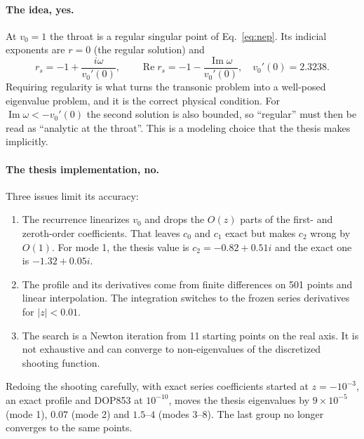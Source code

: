 \documentclass[11pt]{article}
\newcommand{\Real}{\operatorname{Re}}
\newcommand{\Imag}{\operatorname{Im}}
\begin{document}
\paragraph{The idea, yes.} At $v_0=1$ the throat is a regular singular point of Eq.~\eqref{eq:nep}. Its
indicial exponents are $r=0$ (the regular solution) and
\begin{equation}
  r_s = -1 + \frac{i\omega}{v_0'(0)},\qquad \Real r_s = -1 - \frac{\Imag\omega}{v_0'(0)},\quad v_0'(0)=2.3238 .
\end{equation}
Requiring regularity is what turns the transonic problem into a well-posed eigenvalue problem, and it is the
correct physical condition. For $\Imag\omega<-v_0'(0)$ the second solution is also bounded, so ``regular'' must
then be read as ``analytic at the throat''. This is a modeling choice that the thesis makes implicitly.

\paragraph{The thesis implementation, no.} Three issues limit its accuracy:
\begin{enumerate}
  \item The recurrence linearizes $v_0$ and drops the $O(z)$ parts of the first- and zeroth-order
  coefficients. That leaves $c_0$ and $c_1$ exact but makes $c_2$ wrong by $O(1)$. For mode 1, the thesis
  value is $c_2=-0.82+0.51i$ and the exact one is $-1.32+0.05i$.
  \item The profile and its derivatives come from finite differences on 501 points and linear interpolation.
  The integration switches to the frozen series derivatives for $|z|<0.01$.
  \item The search is a Newton iteration from 11 starting points on the real axis. It is not exhaustive and
  can converge to non-eigenvalues of the discretized shooting function.
\end{enumerate}
Redoing the shooting carefully, with exact series coefficients started at $z=-10^{-3}$, an exact profile and
DOP853 at $10^{-10}$, moves the thesis eigenvalues by $9\times10^{-5}$ (mode 1), $0.07$ (mode 2) and
$1.5$--$4$ (modes 3--8). The last group no longer converges to the same points.
\end{document}
